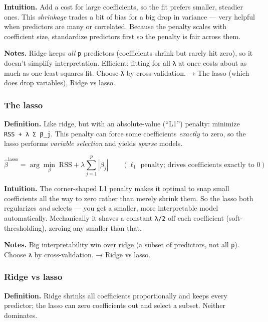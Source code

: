 \documentclass[
  10pt,
  letterpaper,
  onecolumn]{article}
\begin{document}
\textbf{Intuition.} Add a cost for large coefficients, so the fit
prefers smaller, steadier ones. This \emph{shrinkage} trades a bit of
bias for a big drop in variance --- very helpful when predictors are
many or correlated. Because the penalty scales with coefficient size,
standardize predictors first so the penalty is fair across them.

\textbf{Notes.} Ridge keeps \emph{all} \texttt{p} predictors
(coefficients shrink but rarely hit zero), so it doesn't simplify
interpretation. Efficient: fitting for all \texttt{λ} at once costs
about as much as one least-squares fit. Choose \texttt{λ} by
cross-validation. → The lasso (which does drop variables), Ridge vs
lasso.

\hypertarget{the-lasso}{%
\subsubsection{The lasso}\label{the-lasso}}

\textbf{Definition.} Like ridge, but with an absolute-value (``L1'')
penalty: minimize \texttt{RSS\ +\ λ\ Σ\ \textbar{}β\_j\textbar{}}. This
penalty can force some coefficients \emph{exactly} to zero, so the lasso
performs \emph{variable selection} and yields \emph{sparse} models.

\begin{equation*}
\hat\beta^{\text{lasso}}=\arg\min_\beta\;\mathrm{RSS}+\lambda\sum_{j=1}^{p}|\beta_j|
\qquad (\ell_1\text{ penalty; drives coefficients exactly to }0)
\end{equation*}

\textbf{Intuition.} The corner-shaped L1 penalty makes it optimal to
snap small coefficients all the way to zero rather than merely shrink
them. So the lasso both regularizes \emph{and} selects --- you get a
smaller, more interpretable model automatically. Mechanically it shaves
a constant \texttt{λ/2} off each coefficient (soft-thresholding),
zeroing any smaller than that.

\textbf{Notes.} Big interpretability win over ridge (a subset of
predictors, not all \texttt{p}). Choose \texttt{λ} by cross-validation.
→ Ridge vs lasso.

\hypertarget{ridge-vs-lasso}{%
\subsubsection{Ridge vs lasso}\label{ridge-vs-lasso}}

\textbf{Definition.} Ridge shrinks all coefficients proportionally and
keeps every predictor; the lasso can zero coefficients out and select a
subset. Neither dominates.
\end{document}
